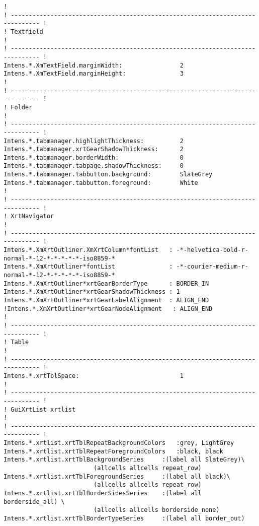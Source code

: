 {\begin{verbatim}
!
! ------------------------------------------------------------------------------ !
! Textfield                                                                      !
! ------------------------------------------------------------------------------ !
Intens.*.XmTextField.marginWidth:                2
Intens.*.XmTextField.marginHeight:               3
!
! ------------------------------------------------------------------------------ !
! Folder                                                                         !
! ------------------------------------------------------------------------------ !
Intens.*.tabmanager.highlightThickness:          2
Intens.*.tabmanager.xrtGearShadowThickness:      2
Intens.*.tabmanager.borderWidth:                 0
Intens.*.tabmanager.tabpage.shadowThickness:     0
Intens.*.tabmanager.tabbutton.background:        SlateGrey
Intens.*.tabmanager.tabbutton.foreground:        White
!
! ------------------------------------------------------------------------------ !
! XrtNavigator                                                                   !
! ------------------------------------------------------------------------------ !
Intens.*.XmXrtOutliner.XmXrtColumn*fontList   : -*-helvetica-bold-r-normal-*-12-*-*-*-*-*-iso8859-*
Intens.*.XmXrtOutliner*fontList               : -*-courier-medium-r-normal-*-12-*-*-*-*-*-iso8859-*
Intens.*.XmXrtOutliner*xrtGearBorderType      : BORDER_IN
Intens.*.XmXrtOutliner*xrtGearShadowThickness : 1
Intens.*.XmXrtOutliner*xrtGearLabelAlignment  : ALIGN_END
!Intens.*.XmXrtOutliner*xrtGearNodeAlignment   : ALIGN_END
!
! ------------------------------------------------------------------------------ !
! Table                                                                          !
! ------------------------------------------------------------------------------ !
Intens.*.xrtTblSpace:                            1
!
! ------------------------------------------------------------------------------ !
! GuiXrtList xrtlist                                                             !
! ------------------------------------------------------------------------------ !
Intens.*.xrtlist.xrtTblRepeatBackgroundColors	:grey, LightGrey
Intens.*.xrtlist.xrtTblRepeatForegroundColors	:black, black
Intens.*.xrtlist.xrtTblBackgroundSeries		:(label all SlateGrey)\
						 (allcells allcells repeat_row)
Intens.*.xrtlist.xrtTblForegroundSeries		:(label all black)\
						 (allcells allcells repeat_row)
Intens.*.xrtlist.xrtTblBorderSidesSeries	:(label all borderside_all) \
						 (allcells allcells borderside_none)
Intens.*.xrtlist.xrtTblBorderTypeSeries		:(label all border_out)

\end{verbatim}}
